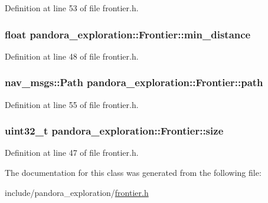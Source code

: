 \-Definition at line 53 of file frontier.\-h.

\hypertarget{classpandora__exploration_1_1_frontier_a740f8b712061428819527269f4dcde42}{
\subsubsection[{min\-\_\-distance}]{\setlength{\rightskip}{0pt plus 5cm}float {\bf pandora\-\_\-exploration\-::\-Frontier\-::min\-\_\-distance}}}\label{classpandora__exploration_1_1_frontier_a740f8b712061428819527269f4dcde42}


\-Definition at line 48 of file frontier.\-h.

\hypertarget{classpandora__exploration_1_1_frontier_aee289fe84ddd496dafbdf90a0258554e}{
\subsubsection[{path}]{\setlength{\rightskip}{0pt plus 5cm}nav\-\_\-msgs\-::\-Path {\bf pandora\-\_\-exploration\-::\-Frontier\-::path}}}\label{classpandora__exploration_1_1_frontier_aee289fe84ddd496dafbdf90a0258554e}


\-Definition at line 55 of file frontier.\-h.

\hypertarget{classpandora__exploration_1_1_frontier_a86b37f33e2936fe582e8bab003d2441d}{
\subsubsection[{size}]{\setlength{\rightskip}{0pt plus 5cm}uint32\-\_\-t {\bf pandora\-\_\-exploration\-::\-Frontier\-::size}}}\label{classpandora__exploration_1_1_frontier_a86b37f33e2936fe582e8bab003d2441d}


\-Definition at line 47 of file frontier.\-h.



\-The documentation for this class was generated from the following file\-:\begin{DoxyCompactItemize}
\item 
include/pandora\-\_\-exploration/\hyperlink{frontier_8h}{frontier.\-h}\end{DoxyCompactItemize}

